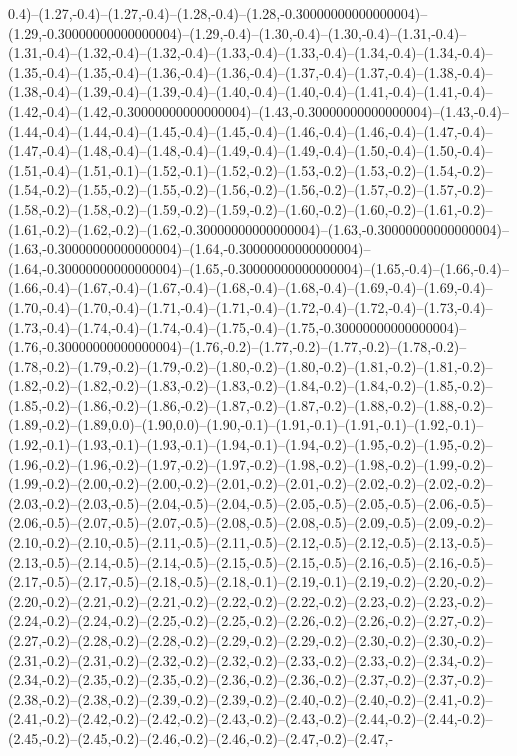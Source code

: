 0.4)--(1.27,-0.4)--(1.27,-0.4)--(1.28,-0.4)--(1.28,-0.30000000000000004)--(1.29,-0.30000000000000004)--(1.29,-0.4)--(1.30,-0.4)--(1.30,-0.4)--(1.31,-0.4)--(1.31,-0.4)--(1.32,-0.4)--(1.32,-0.4)--(1.33,-0.4)--(1.33,-0.4)--(1.34,-0.4)--(1.34,-0.4)--(1.35,-0.4)--(1.35,-0.4)--(1.36,-0.4)--(1.36,-0.4)--(1.37,-0.4)--(1.37,-0.4)--(1.38,-0.4)--(1.38,-0.4)--(1.39,-0.4)--(1.39,-0.4)--(1.40,-0.4)--(1.40,-0.4)--(1.41,-0.4)--(1.41,-0.4)--(1.42,-0.4)--(1.42,-0.30000000000000004)--(1.43,-0.30000000000000004)--(1.43,-0.4)--(1.44,-0.4)--(1.44,-0.4)--(1.45,-0.4)--(1.45,-0.4)--(1.46,-0.4)--(1.46,-0.4)--(1.47,-0.4)--(1.47,-0.4)--(1.48,-0.4)--(1.48,-0.4)--(1.49,-0.4)--(1.49,-0.4)--(1.50,-0.4)--(1.50,-0.4)--(1.51,-0.4)--(1.51,-0.1)--(1.52,-0.1)--(1.52,-0.2)--(1.53,-0.2)--(1.53,-0.2)--(1.54,-0.2)--(1.54,-0.2)--(1.55,-0.2)--(1.55,-0.2)--(1.56,-0.2)--(1.56,-0.2)--(1.57,-0.2)--(1.57,-0.2)--(1.58,-0.2)--(1.58,-0.2)--(1.59,-0.2)--(1.59,-0.2)--(1.60,-0.2)--(1.60,-0.2)--(1.61,-0.2)--(1.61,-0.2)--(1.62,-0.2)--(1.62,-0.30000000000000004)--(1.63,-0.30000000000000004)--(1.63,-0.30000000000000004)--(1.64,-0.30000000000000004)--(1.64,-0.30000000000000004)--(1.65,-0.30000000000000004)--(1.65,-0.4)--(1.66,-0.4)--(1.66,-0.4)--(1.67,-0.4)--(1.67,-0.4)--(1.68,-0.4)--(1.68,-0.4)--(1.69,-0.4)--(1.69,-0.4)--(1.70,-0.4)--(1.70,-0.4)--(1.71,-0.4)--(1.71,-0.4)--(1.72,-0.4)--(1.72,-0.4)--(1.73,-0.4)--(1.73,-0.4)--(1.74,-0.4)--(1.74,-0.4)--(1.75,-0.4)--(1.75,-0.30000000000000004)--(1.76,-0.30000000000000004)--(1.76,-0.2)--(1.77,-0.2)--(1.77,-0.2)--(1.78,-0.2)--(1.78,-0.2)--(1.79,-0.2)--(1.79,-0.2)--(1.80,-0.2)--(1.80,-0.2)--(1.81,-0.2)--(1.81,-0.2)--(1.82,-0.2)--(1.82,-0.2)--(1.83,-0.2)--(1.83,-0.2)--(1.84,-0.2)--(1.84,-0.2)--(1.85,-0.2)--(1.85,-0.2)--(1.86,-0.2)--(1.86,-0.2)--(1.87,-0.2)--(1.87,-0.2)--(1.88,-0.2)--(1.88,-0.2)--(1.89,-0.2)--(1.89,0.0)--(1.90,0.0)--(1.90,-0.1)--(1.91,-0.1)--(1.91,-0.1)--(1.92,-0.1)--(1.92,-0.1)--(1.93,-0.1)--(1.93,-0.1)--(1.94,-0.1)--(1.94,-0.2)--(1.95,-0.2)--(1.95,-0.2)--(1.96,-0.2)--(1.96,-0.2)--(1.97,-0.2)--(1.97,-0.2)--(1.98,-0.2)--(1.98,-0.2)--(1.99,-0.2)--(1.99,-0.2)--(2.00,-0.2)--(2.00,-0.2)--(2.01,-0.2)--(2.01,-0.2)--(2.02,-0.2)--(2.02,-0.2)--(2.03,-0.2)--(2.03,-0.5)--(2.04,-0.5)--(2.04,-0.5)--(2.05,-0.5)--(2.05,-0.5)--(2.06,-0.5)--(2.06,-0.5)--(2.07,-0.5)--(2.07,-0.5)--(2.08,-0.5)--(2.08,-0.5)--(2.09,-0.5)--(2.09,-0.2)--(2.10,-0.2)--(2.10,-0.5)--(2.11,-0.5)--(2.11,-0.5)--(2.12,-0.5)--(2.12,-0.5)--(2.13,-0.5)--(2.13,-0.5)--(2.14,-0.5)--(2.14,-0.5)--(2.15,-0.5)--(2.15,-0.5)--(2.16,-0.5)--(2.16,-0.5)--(2.17,-0.5)--(2.17,-0.5)--(2.18,-0.5)--(2.18,-0.1)--(2.19,-0.1)--(2.19,-0.2)--(2.20,-0.2)--(2.20,-0.2)--(2.21,-0.2)--(2.21,-0.2)--(2.22,-0.2)--(2.22,-0.2)--(2.23,-0.2)--(2.23,-0.2)--(2.24,-0.2)--(2.24,-0.2)--(2.25,-0.2)--(2.25,-0.2)--(2.26,-0.2)--(2.26,-0.2)--(2.27,-0.2)--(2.27,-0.2)--(2.28,-0.2)--(2.28,-0.2)--(2.29,-0.2)--(2.29,-0.2)--(2.30,-0.2)--(2.30,-0.2)--(2.31,-0.2)--(2.31,-0.2)--(2.32,-0.2)--(2.32,-0.2)--(2.33,-0.2)--(2.33,-0.2)--(2.34,-0.2)--(2.34,-0.2)--(2.35,-0.2)--(2.35,-0.2)--(2.36,-0.2)--(2.36,-0.2)--(2.37,-0.2)--(2.37,-0.2)--(2.38,-0.2)--(2.38,-0.2)--(2.39,-0.2)--(2.39,-0.2)--(2.40,-0.2)--(2.40,-0.2)--(2.41,-0.2)--(2.41,-0.2)--(2.42,-0.2)--(2.42,-0.2)--(2.43,-0.2)--(2.43,-0.2)--(2.44,-0.2)--(2.44,-0.2)--(2.45,-0.2)--(2.45,-0.2)--(2.46,-0.2)--(2.46,-0.2)--(2.47,-0.2)--(2.47,-